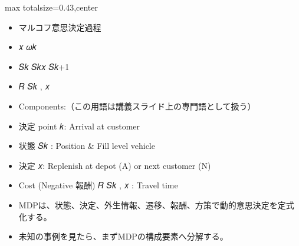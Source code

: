\clearpage
{}
\begin{minipage}[t]{0.405\textwidth}
\begin{adjustbox}{max totalsize={\textwidth}{0.43\textheight},center}
\begin{minipage}{\textwidth}\scriptsize
{}\begin{itemize}
\item マルコフ意思決定過程
\item 𝑥 𝜔𝑘
\item 𝑆𝑘 𝑆𝑘𝑥 𝑆𝑘+1
\item 𝑅 𝑆𝑘 , 𝑥
\item Components:（この用語は講義スライド上の専門語として扱う）
\item 決定 point 𝑘: Arrival at customer
\item 状態 𝑆𝑘 : Position \& Fill level vehicle
\item 決定 𝑥: Replenish at depot (A) or next customer (N)
\item Cost (Negative 報酬) 𝑅 𝑆𝑘 , 𝑥 : Travel time
\end{itemize}\begin{itemize}
\item MDPは、状態、決定、外生情報、遷移、報酬、方策で動的意思決定を定式化する。
\item 未知の事例を見たら、まずMDPの構成要素へ分解する。
\end{itemize}
\end{minipage}
\end{adjustbox}
\end{minipage}\hfill
